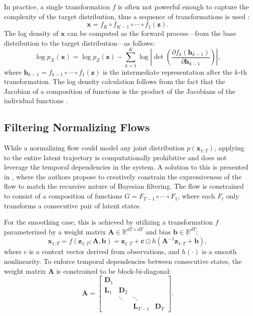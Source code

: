 \documentclass[11pt,a4paper]{article}
\begin{document}
In practice, a single transformation $f$ is often not powerful enough to capture the complexity of the target distribution, thus a sequence of transformations is used \cite{rezende2015variational, kingma2018glow, dinh2017density}:
\begin{equation}
    \mathbf{x} = f_K \circ f_{K-1} \circ \cdots \circ f_1(\mathbf{z}).
\end{equation}
The log density of $\mathbf{x}$ can be computed as the forward process—from the base distribution to the target distribution—as follows:
\begin{equation}
    \log p_X(\mathbf{x}) = \log p_Z(\mathbf{z}) - \sum_{k=1}^K \log \left| \det \left(\frac{\partial f_k(\mathbf{h}_{k-1})}{\partial \mathbf{h}_{k-1}} \right) \right|,
\end{equation}
\noindent where $\mathbf{h}_{k-1} = f_{k-1} \circ \cdots \circ f_1(\mathbf{z})$ is the intermediate representation after the $k$-th transformation. The log density calculation follows from the fact that the Jacobian of a composition of functions is the product of the Jacobians of the individual functions \cite{murphy2023probabilistic}.

\subsection{Filtering Normalizing Flows}

While a normalizing flow could model any joint distribution $p(\mathbf{x}_{1:T})$, applying to the entire latent trajectory is computationally prohibitive and does not leverage the temporal dependencies in the system. A solution to this is presented in \cite{razaghi2019filtering}, where the authors propose to creatively constrain the expressiveness of the flow to match the recursive nature of Bayesian filtering. The flow is constrained to consist of a composition of functions $G = F_{T-1} \circ \cdots \circ F_1$, where each $F_t$ only transforms a consecutive pair of latent states. 

For the smoothing case, this is achieved by utilizing a transformation $f$ parameterized by a weight matrix $\mathbf{A} \in \mathbb{R}^{dT \times dT}$ and bias $\mathbf{b} \in \mathbb{R}^{dT}$:
\begin{equation}
\mathbf{x}_{1:T} = f(\mathbf{z}_{1:T}; \mathbf{A}, \mathbf{b}) = \mathbf{z}_{1:T} + \mathbf{c} \odot h(\mathbf{A}^{-1}\mathbf{z}_{1:T} + \mathbf{b}),
\end{equation}
where $c$ is a context vector derived from observations, and $h(\cdot)$ is a smooth nonlinearity. To enforce temporal dependencies between consecutive states, the weight matrix $\mathbf{A}$ is constrained to be block-bi-diagonal:
\begin{equation}
\mathbf{A} =
\begin{bmatrix}
\mathbf{D}_1 &  &  &  \\
\mathbf{L}_1 & \mathbf{D}_2 &  &  \\
 & \ddots & \ddots & \\
 &  & \mathbf{L}_{T-1} & \mathbf{D}_T
\end{bmatrix}
.
\end{equation}
\end{document}
